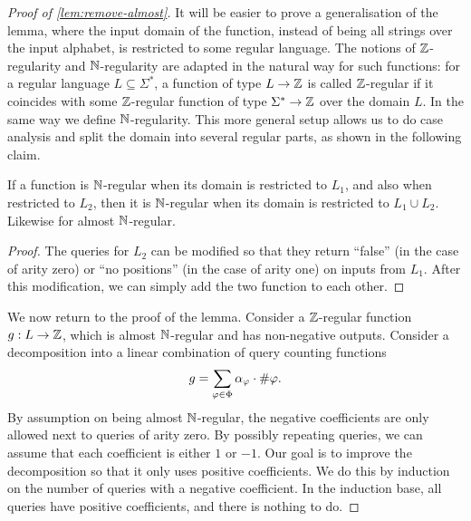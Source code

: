    \begin{proof}[Proof of \cref{lem:remove-almost}]
        It will be easier to prove a generalisation of the lemma,  where the input domain of the function, instead of being  all strings over the input alphabet, is restricted to  some regular language. The notions of ${\mathbb Z}$-regularity and ${\mathbb N}$-regularity are adapted in the natural way for such functions: for a regular language $L \subseteq \Sigma^*$, a function of type  $ L \to {\mathbb Z}$ is called ${\mathbb Z}$-regular if it coincides with some ${\mathbb Z}$-regular function of type $ \Sigma^* \to {\mathbb Z}$ over the domain $L$. In the same way we define ${\mathbb N}$-regularity. This more general setup allows us to do case analysis and split the domain into several regular parts, as shown in the  following claim.


    \begin{claim}\label{claim:aggregate-two-domains} If a  function  is  ${\mathbb N}$-regular when its domain is restricted to $L_1$,  and also when restricted to $L_2$, then it is  ${\mathbb N}$-regular when its domain is restricted to $L_1 \cup L_2$. Likewise for almost ${\mathbb N}$-regular.
    \end{claim}
    \begin{proof}
        The queries for $L_2$ can be modified so that they return ``false'' (in the case of arity zero) or ``no positions'' (in the case of arity one) on inputs from $L_1$. After this modification, we can simply add the two function to each other.
    \end{proof}

     We now return to the proof of the lemma.  
         Consider a ${\mathbb Z}$-regular function $g : L \to {\mathbb Z}$, which is almost ${\mathbb N}$-regular and has non-negative outputs. Consider  a decomposition into a linear combination of query counting functions 
        \begin{align*}
        g = \sum_{\varphi \in \Phi} \alpha_\varphi \cdot \#{\varphi}.
        \end{align*}
        By assumption on being almost ${\mathbb N}$-regular, the negative coefficients are only allowed next to queries of arity zero. 
        By possibly repeating queries, we can assume that each coefficient is either $1$ or $-1$. Our goal is to improve the decomposition so that it only uses positive coefficients. We do this by induction on the number of queries with a negative coefficient. In the induction base, all queries have positive coefficients, and there is nothing to do.


\end{proof}
